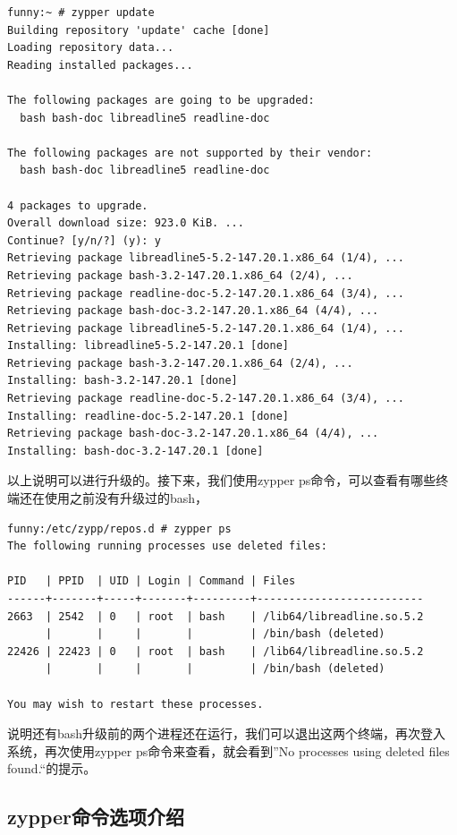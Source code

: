 \small{
\begin{verbatim}
funny:~ # zypper update
Building repository 'update' cache [done]
Loading repository data...
Reading installed packages...

The following packages are going to be upgraded:
  bash bash-doc libreadline5 readline-doc 

The following packages are not supported by their vendor:
  bash bash-doc libreadline5 readline-doc 

4 packages to upgrade.
Overall download size: 923.0 KiB. ...
Continue? [y/n/?] (y): y
Retrieving package libreadline5-5.2-147.20.1.x86_64 (1/4), ...
Retrieving package bash-3.2-147.20.1.x86_64 (2/4), ...
Retrieving package readline-doc-5.2-147.20.1.x86_64 (3/4), ...
Retrieving package bash-doc-3.2-147.20.1.x86_64 (4/4), ...
Retrieving package libreadline5-5.2-147.20.1.x86_64 (1/4), ...
Installing: libreadline5-5.2-147.20.1 [done]
Retrieving package bash-3.2-147.20.1.x86_64 (2/4), ...
Installing: bash-3.2-147.20.1 [done]
Retrieving package readline-doc-5.2-147.20.1.x86_64 (3/4), ...
Installing: readline-doc-5.2-147.20.1 [done]
Retrieving package bash-doc-3.2-147.20.1.x86_64 (4/4), ...
Installing: bash-doc-3.2-147.20.1 [done]
\end{verbatim}
}
\normalsize

以上说明可以进行升级的。接下来，我们使用zypper ps命令，可以查看有哪些终
端还在使用之前没有升级过的bash，

\small{
\begin{verbatim}
funny:/etc/zypp/repos.d # zypper ps
The following running processes use deleted files:

PID   | PPID  | UID | Login | Command | Files                    
------+-------+-----+-------+---------+--------------------------
2663  | 2542  | 0   | root  | bash    | /lib64/libreadline.so.5.2
      |       |     |       |         | /bin/bash (deleted)      
22426 | 22423 | 0   | root  | bash    | /lib64/libreadline.so.5.2
      |       |     |       |         | /bin/bash (deleted)      

You may wish to restart these processes.
\end{verbatim}
}
\normalsize

说明还有bash升级前的两个进程还在运行，我们可以退出这两个终端，再次登入
系统，再次使用zypper ps命令来查看，就会看到”No processes using deleted
files found.“的提示。

\subsection{zypper命令选项介绍}
\label{subsec:zypperCmdopt}

